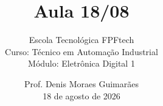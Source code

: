 
\title{Aula 18/08}

\subtitle{
\vspace{1.0cm}
Escola Tecnológica FPFtech\\
\vspace{0.5cm}
Curso: Técnico em Automação Industrial\\
\vspace{0.5cm}
Módulo: Eletrônica Digital 1
\vspace{1.0cm}
}

\author{
Prof. Denis Moraes Guimarães\\
\small 18 de agosto de 2026
}

\date{}